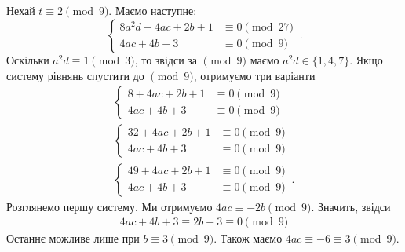 \documentclass{thesis}
\begin{document}
Нехай $t \equiv 2 \pmod 9$. Маємо наступне:
\begin{equation*}
    \begin{cases}
      8 a^2 d  + 4 ac + 2b + 1 & \equiv 0 \pmod {27} \\
      4ac + 4b + 3 & \equiv 0 \pmod {9} 
    \end{cases}\,.
\end{equation*}
Оскільки $a^2 d \equiv 1 \pmod 3$, то звідси за $\pmod 9$ маємо $a^2 d \in \{1,4,7\}$. Якщо систему рівнянь спустити до $\pmod 9$, отримуємо три варіанти
\begin{align*}
    \begin{cases}
      8  + 4 ac + 2b + 1 & \equiv 0 \pmod {9} \\
      4ac + 4b + 3 & \equiv 0 \pmod {9} 
    \end{cases}\, \\    \begin{cases}
      32  + 4 ac + 2b + 1 & \equiv 0 \pmod {9} \\
      4ac + 4b + 3 & \equiv 0 \pmod {9} 
    \end{cases}\, \\     \begin{cases}
      49  + 4 ac + 2b + 1 & \equiv 0 \pmod {9} \\
      4ac + 4b + 3 & \equiv 0 \pmod {9} 
    \end{cases}\,.
\end{align*}
Розглянемо першу систему. Ми отримуємо $4ac \equiv -2b \pmod 9$. Значить, звідси
\begin{align*}
4ac + 4b + 3 \equiv 2b + 3 \equiv 0 \pmod 9
\end{align*}
Останнє можливе лише при $b \equiv 3 \pmod 9$. Також маємо $4ac \equiv -6 \equiv 3 \pmod 9$.
\end{document}
